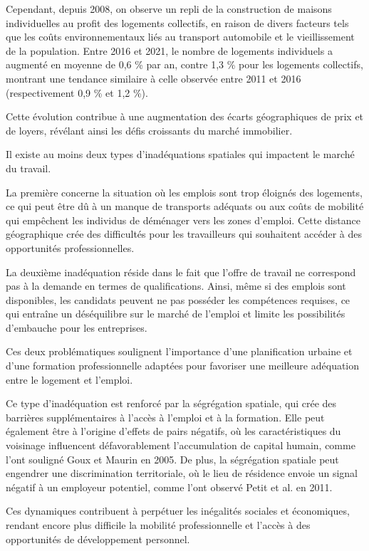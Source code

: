\documentclass[a4paper, 12pt]{report}
\begin{document}
Cependant, depuis 2008, on observe un repli de la construction de maisons individuelles au profit des logements collectifs, en raison de divers facteurs tels que les coûts environnementaux liés au transport automobile et le vieillissement de la population. Entre 2016 et 2021, le nombre de logements individuels a augmenté en moyenne de 0,6 \% par an, contre 1,3 \% pour les logements collectifs, montrant une tendance similaire à celle observée entre 2011 et 2016 (respectivement 0,9 \% et 1,2 \%).

Cette évolution contribue à une augmentation des écarts géographiques de prix et de loyers, révélant ainsi les défis croissants du marché immobilier.

Il existe au moins deux types d’inadéquations spatiales qui impactent le marché du travail.

La première concerne la situation où les emplois sont trop éloignés des logements, ce qui peut être dû à un manque de transports adéquats ou aux coûts de mobilité qui empêchent les individus de déménager vers les zones d'emploi. Cette distance géographique crée des difficultés pour les travailleurs qui souhaitent accéder à des opportunités professionnelles. 

La deuxième inadéquation réside dans le fait que l’offre de travail ne correspond pas à la demande en termes de qualifications. Ainsi, même si des emplois sont disponibles, les candidats peuvent ne pas posséder les compétences requises, ce qui entraîne un déséquilibre sur le marché de l'emploi et limite les possibilités d'embauche pour les entreprises. 

Ces deux problématiques soulignent l'importance d'une planification urbaine et d'une formation professionnelle adaptées pour favoriser une meilleure adéquation entre le logement et l'emploi.

Ce type d’inadéquation est renforcé par la ségrégation spatiale, qui crée des barrières supplémentaires à l'accès à l'emploi et à la formation. Elle peut également être à l’origine d’effets de pairs négatifs, où les caractéristiques du voisinage influencent défavorablement l'accumulation de capital humain, comme l'ont souligné Goux et Maurin en 2005. De plus, la ségrégation spatiale peut engendrer une discrimination territoriale, où le lieu de résidence envoie un signal négatif à un employeur potentiel, comme l'ont observé Petit et al. en 2011.

Ces dynamiques contribuent à perpétuer les inégalités sociales et économiques, rendant encore plus difficile la mobilité professionnelle et l'accès à des opportunités de développement personnel.
\end{document}
